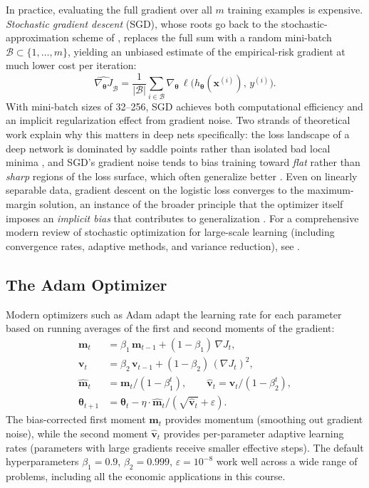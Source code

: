 \documentclass[11pt,a4paper]{report}
\newcommand{\x}{\bm{x}}
\begin{document}
In practice, evaluating the full gradient over all $m$ training examples is expensive.  \emph{Stochastic gradient descent} (SGD), whose roots go back to the stochastic-approximation scheme of \citet{robbins1951stochastic}, replaces the full sum with a random mini-batch $\mathcal{B} \subset \{1, \dots, m\}$, yielding an unbiased estimate of the empirical-risk gradient at much lower cost per iteration:
\begin{equation}
\widehat{\nabla_{\!\bm{\theta}} J}_{\mathcal{B}}
= \frac{1}{|\mathcal{B}|}\sum_{i \in \mathcal{B}} \nabla_{\!\bm{\theta}}\,\ell\bigl(h_{\bm{\theta}}(\x^{(i)}),\, y^{(i)}\bigr).
\end{equation}
With mini-batch sizes of 32--256, SGD achieves both computational efficiency and an implicit regularization effect from gradient noise.  Two strands of theoretical work explain why this matters in deep nets specifically: the loss landscape of a deep network is dominated by saddle points rather than isolated bad local minima \citep{dauphin2014identifying}, and SGD's gradient noise tends to bias training toward \emph{flat} rather than \emph{sharp} regions of the loss surface, which often generalize better \citep{keskar2017large}.  Even on linearly separable data, gradient descent on the logistic loss converges to the maximum-margin solution, an instance of the broader principle that the optimizer itself imposes an \emph{implicit bias} that contributes to generalization \citep{soudry2018implicit}.  For a comprehensive modern review of stochastic optimization for large-scale learning (including convergence rates, adaptive methods, and variance reduction), see \citet{bottou2018optimization}.

\subsection{The Adam Optimizer}

Modern optimizers such as Adam \citep{kingma2015adam} adapt the learning rate for each parameter based on running averages of the first and second moments of the gradient:
\begin{align}
\bm{m}_t &= \beta_1\,\bm{m}_{t-1} + (1-\beta_1)\,\nabla J_t, \\
\bm{v}_t &= \beta_2\,\bm{v}_{t-1} + (1-\beta_2)\,(\nabla J_t)^2, \\
\hat{\bm{m}}_t &= \bm{m}_t/(1-\beta_1^t), \qquad \hat{\bm{v}}_t = \bm{v}_t/(1-\beta_2^t), \\
\bm{\theta}_{t+1} &= \bm{\theta}_t - \eta \cdot \hat{\bm{m}}_t / (\sqrt{\hat{\bm{v}}_t} + \varepsilon).
\end{align}
The bias-corrected first moment $\hat{\bm{m}}_t$ provides momentum (smoothing out gradient noise), while the second moment $\hat{\bm{v}}_t$ provides per-parameter adaptive learning rates (parameters with large gradients receive smaller effective steps).  The default hyperparameters $\beta_1=0.9$, $\beta_2=0.999$, $\varepsilon=10^{-8}$ work well across a wide range of problems, including all the economic applications in this course.
\end{document}
